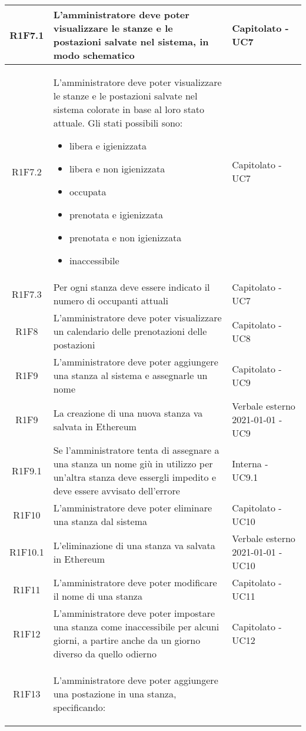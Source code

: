 \begin{center}
\begin{longtable}{|c|p{10cm}|p{4cm}|}
		\hline
		R1F7.1&L'amministratore deve poter visualizzare le stanze e le postazioni salvate nel sistema, in modo schematico& Capitolato - UC7	\\
		\hline
		R1F7.2&L'amministratore deve poter visualizzare le stanze e le postazioni salvate nel sistema colorate in base al loro stato attuale. Gli stati possibili sono:
		\begin{itemize}
			\item libera e igienizzata
			\item libera e non igienizzata
			\item occupata
			\item prenotata e igienizzata
			\item prenotata e non igienizzata
			\item inaccessibile
		\end{itemize}& Capitolato - UC7	\\
		\hline
		R1F7.3&Per ogni stanza deve essere indicato il numero di occupanti attuali	& Capitolato - UC7	\\
		\hline
		R1F8&L'amministratore deve poter visualizzare un calendario delle prenotazioni delle postazioni	& Capitolato - UC8	\\
		\hline
		R1F9&L'amministratore deve poter aggiungere una stanza al sistema e assegnarle un nome	& Capitolato - UC9	\\
		\hline
		R1F9&	La creazione di una nuova stanza va salvata in Ethereum&Verbale esterno 2021-01-01 - UC9 	\\
		\hline
		R1F9.1 & Se l'amministratore tenta di assegnare a una stanza un nome giù in utilizzo per un'altra stanza deve essergli impedito e deve essere avvisato dell'errore & Interna - UC9.1 \\
		R1F10&L'amministratore deve poter eliminare una stanza dal sistema	& Capitolato - UC10	\\
		\hline
		R1F10.1&L'eliminazione di una stanza va salvata in Ethereum	& Verbale esterno 2021-01-01 - UC10	\\
		\hline
		R1F11&L'amministratore deve poter modificare il nome di una stanza	& Capitolato - UC11	\\
		\hline
		R1F12&L'amministratore deve poter impostare una stanza come inaccessibile per alcuni giorni, a partire anche da un giorno diverso da quello odierno	& Capitolato - UC12	\\
		\hline
		R1F13&L'amministratore deve poter aggiungere una postazione in una stanza, specificando:
		\begin{itemize}

\end{itemize}
\end{longtable}
\end{center}
